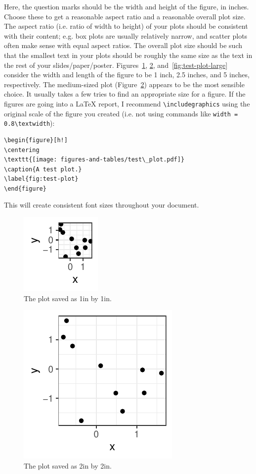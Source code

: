 \documentclass[11pt,letterpaper,english,oneside]{article}\usepackage[]{graphicx}\usepackage[]{xcolor}
\begin{document}
\noindent Here, the question marks should be the width and height of the figure, in inches. Choose these to get a reasonable aspect ratio and a reasonable overall plot size. The aspect ratio (i.e. ratio of width to height) of your plots should be consistent with their content; e.g. box plots are usually relatively narrow, and scatter plots often make sense with equal aspect ratios. The overall plot size should be such that the smallest text in your plots should be roughly the same size as the text in the rest of your slides/paper/poster. Figures~\ref{fig:test-plot-small}, \ref{fig:test-plot-medium}, and~\ref{fig:test-plot-large} consider the width and length of the figure to be 1 inch, 2.5 inches, and 5 inches, respectively. The medium-sized plot (Figure~\ref{fig:test-plot-medium}) appears to be the most sensible choice. It usually takes a few tries to find an appropriate size for a figure. If the figures are going into a LaTeX report, I recommend \verb|\includegraphics| using the original scale of the figure you created (i.e. not using commands like \verb|width = 0.8\textwidth|): 
\begin{verbatim}
\begin{figure}[h!]
\centering
\texttt{[image: figures-and-tables/test\_plot.pdf]}
\caption{A test plot.}
\label{fig:test-plot}
\end{figure}
\end{verbatim}
This will create consistent font sizes throughout your document.



\begin{figure}[h!]
\centering
\includegraphics{figures-and-tables/test_plot_small.pdf}
\caption{The plot saved as 1in by 1in.}
\label{fig:test-plot-small}
\end{figure}

\begin{figure}[h!]
\centering
\includegraphics{figures-and-tables/test_plot_medium.pdf}
\caption{The plot saved as 2in by 2in.}
\label{fig:test-plot-medium}
\end{figure}
\end{document}
